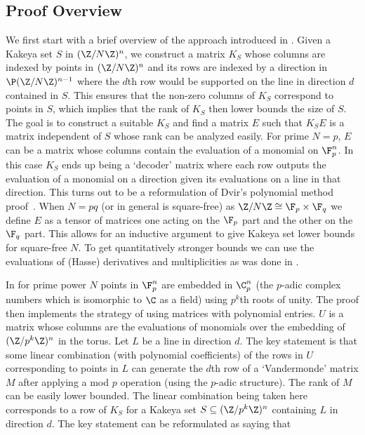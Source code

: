 \subsection{Proof Overview}\label{sec:proofOver}
We first start with a brief overview of the approach introduced in \cite{dhar2021proof}. Given a Kakeya set $S$ in $(\Z/N\Z)^n$, we construct a matrix $K_S$ whose columns are indexed by points in $(\Z/N\Z)^n$ and its rows are indexed by a direction in $\P (\Z/N\Z)^{n-1}$ where the $d$th row would be supported on the line in direction $d$ contained in $S$. This ensures that the non-zero columns of $K_S$ correspond to points in $S$, which implies that the rank of $K_S$ then lower bounds the size of $S$. The goal is to construct a suitable $K_S$ and find a matrix $E$ such that $K_SE$ is a matrix independent of $S$ whose rank can be analyzed easily. For prime $N=p$, $E$ can be a matrix whose columns contain the evaluation of a monomial on $\F_p^n$. In this case $K_S$ ends up being a `decoder' matrix where each row outputs the evaluation of a monomial on a direction given its evaluations on a line in that direction. This turns out to be a reformulation of Dvir's polynomial method proof~\cite{dvir2009size}. When $N=pq$ (or in general is square-free) as $\Z/N\Z\cong \F_p\times \F_q$ we define $E$ as a tensor of matrices one acting on the $\F_p$ part and the other on the $\F_q$ part. This allows for an inductive argument to give Kakeya set lower bounds for square-free $N$. To get quantitatively stronger bounds we can use the evaluations of (Hasse) derivatives and multiplicities as was done in \cite{saraf2008,dvir2013extensions}.

In \cite{arsovski2021padic} for prime power $N$ points in $\F_p^n$ are embedded in $\C_p^n$ (the $p$-adic complex numbers which is isomorphic to $\C$ as a field) using $p^k$th roots of unity. The proof then implements the strategy of \cite{dhar2021proof} using matrices with polynomial entries. $U$ is a matrix whose columns are the evaluations of monomials over the embedding of $(\Z/p^k\Z)^n$ in the torus. Let $L$ be a line in direction $d$. The key statement is that some linear combination (with polynomial coefficients) of the rows in $U$ corresponding to points in $L$ can generate the $d$th row of a `Vandermonde' matrix $M$ after applying a mod $p$ operation (using the $p$-adic structure). The rank of $M$ can be easily lower bounded. The linear combination being taken here corresponds to a row of $K_S$ for a Kakeya set $S\subseteq (\Z/p^k\Z)^n$ containing $L$ in direction $d$. The key statement can be reformulated as saying that 

